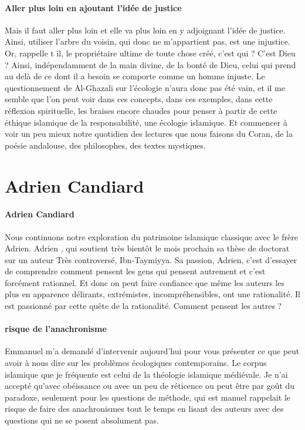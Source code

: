 \paragraph{Aller plus loin en ajoutant l'idée de justice}
Mais il faut aller plus loin et elle va plus loin en y adjoignant l'idée de justice. Ainsi, utiliser l'arbre du voisin, qui donc ne m'appartient pas, est une injustice. Or, rappelle t il, le propriétaire ultime de toute chose créé, c'est qui ?
C'est Dieu ? Ainsi, indépendamment de la main divine, de la bonté de Dieu, celui qui prend au delà de ce dont il a besoin se comporte comme un homme injuste. Le questionnement de Al-Ghazali sur l'écologie n'aura donc pas été vain, et il me semble que l'on peut voir dans ces concepts, dans ces exemples, dans cette réflexion spirituelle, les braises encore chaudes pour penser à partir de cette éthique islamique de la responsabilité, une écologie islamique.
Et commencer à voir un peu mieux notre quotidien des lectures que nous faisons du Coran, de la poésie andalouse, des philosophes, des textes mystiques. 




\section{Adrien Candiard}

\paragraph{Adrien Candiard}
    Nous continuons notre exploration du patrimoine islamique classique avec le frère Adrien. Adrien , qui soutient très bientôt le mois prochain sa thèse de doctorat sur un auteur Très controversé, Ibn-Taymiyya.   Sa passion, Adrien, c'est d'essayer de comprendre comment pensent les gens qui pensent autrement et c'est forcément rationnel. Et donc on peut faire confiance que même les auteurs les plus en apparence délirants, extrémistes, incompréhensibles, ont une rationalité. Il est passionné par cette quête de la rationalité. Comment pensent les autres ? 

    \paragraph{risque de l'anachronisme}
Emmanuel m'a demandé d'intervenir aujourd'hui pour vous présenter ce que peut avoir à nous dire sur les problèmes écologiques contemporains. Le corpus islamique que je fréquente est celui de la théologie islamique médiévale. Je n'ai accepté qu'avec obéissance ou avec un peu de réticence ou peut être par goût du paradoxe, seulement pour les questions de méthode, qui est manuel rappelait le risque de faire des anachronismes tout le temps en lisant des auteurs avec des questions qui ne se posent absolument pas.

